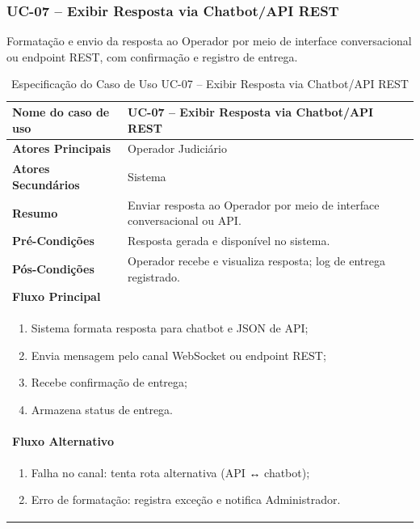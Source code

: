 \begin{description}
\subsubsection{UC-07 – Exibir Resposta via Chatbot/API REST}
\noindent Formatação e envio da resposta ao Operador por meio de interface conversacional ou endpoint REST, com confirmação e registro de entrega.
\begin{table}[H]
  \centering
  \caption{Especificação do Caso de Uso UC-07 – Exibir Resposta via Chatbot/API REST}
  \label{tab:uc07}
  \begin{tabular}{|p{4cm}|p{11cm}|}
    \hline
    \textbf{Nome do caso de uso}    & UC-07 – Exibir Resposta via Chatbot/API REST \\ \hline
    \textbf{Atores Principais}      & Operador Judiciário                          \\ \hline
    \textbf{Atores Secundários}     & Sistema                                      \\ \hline
    \textbf{Resumo}                 & Enviar resposta ao Operador por meio de interface conversacional ou API. \\ \hline
    \textbf{Pré-Condições}          & Resposta gerada e disponível no sistema. \\ \hline
    \textbf{Pós-Condições}          & Operador recebe e visualiza resposta; log de entrega registrado. \\ \hline
    \multicolumn{2}{|l|}{\textbf{Fluxo Principal}} \\ \hline
    \multicolumn{2}{|p{15cm}|}{%
      \begin{enumerate}[leftmargin=*]
        \item Sistema formata resposta para chatbot e JSON de API;
        \item Envia mensagem pelo canal WebSocket ou endpoint REST;
        \item Recebe confirmação de entrega;
        \item Armazena status de entrega.
      \end{enumerate}
    } \\ \hline
    \multicolumn{2}{|l|}{\textbf{Fluxo Alternativo}} \\ \hline
    \multicolumn{2}{|p{15cm}|}{%
      \begin{enumerate}[label=\arabic* a\,.]
        \item Falha no canal: tenta rota alternativa (API ↔ chatbot);
        \item Erro de formatação: registra exceção e notifica Administrador.
      \end{enumerate}
    } \\ \hline
  \end{tabular}
\end{table}


\end{description}
